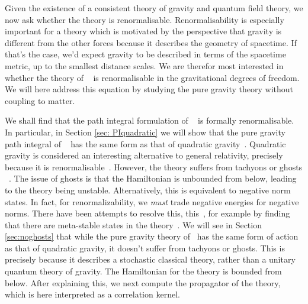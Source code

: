 \documentclass[aps,preprintnumbers,superscriptaddress,longbibliography]{revtex4-1}
\begin{document}
Given the existence of a consistent theory of gravity and quantum field theory, we now ask whether the theory is renormalisable.  Renormalisability is especially important for a theory which is motivated by the perspective that gravity is different from the other forces because it describes the geometry of spacetime. If that's the case, we'd expect gravity to be described in terms of the spacetime metric, up to the smallest distance scales. We are therefor most interested in whether the theory of ~\cite{oppenheim2018post,oppenheim2023covariant} is renormalisable in the gravitational degrees of freedom. We will here address this equation by studying the pure gravity theory without coupling to matter. 

We shall find that the path integral formulation of ~\cite{oppenheim2023covariant} is formally renormalisable. In particular, %
 in Section \ref{sec: PIquadratic} %
we will show that the pure gravity
path integral of ~\cite{oppenheim2023covariant} has the same form as that of quadratic gravity~\cite{stelle1977renormalization,stelle1978classical,SalvioQuadratic18,donoghue2021quadratic}. Quadratic gravity is considered an interesting alternative to general relativity, precisely because it is renormalisable~\cite{stelle1977renormalization}. However, the theory suffers from tachyons or ghosts ~\cite{stelle1977renormalization,woodard2023don,SalvioQuadratic18}.  The issue of ghosts is that the Hamiltonian is unbounded from below, leading to the theory being unstable. 
Alternatively, this is equivalent to negative norm states. In fact, for renormalizability, we  \emph{must} trade negative energies for negative norms. There have been attempts to resolve this, this~\cite{mannheim2020ghost,holdom2016quadratic,donoghue2021quadratic, anselmi2017quantum, salvio2018new, salvio2022bicep}, for example by finding that there are meta-stable states in the theory~\cite{Salvio_2019}.
We will see in Section \ref{sec:noghosts} that while the pure gravity theory of~\cite{oppenheim2018post,oppenheim2023covariant} has the same form of action as that of quadratic gravity, it doesn't suffer from tachyons or ghosts. This is precisely because it describes a stochastic classical theory, rather than a unitary quantum theory of gravity. The Hamiltonian for the theory is bounded from below. After explaining this, we next compute the propagator of the theory, which is here interpreted as a correlation kernel. 
\end{document}
